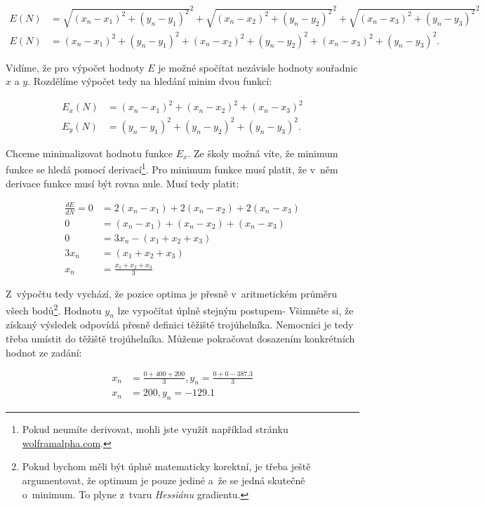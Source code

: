 \documentclass[12pt,a4paper]{article}
\begin{document}
\begin{align}
E(N) &= \sqrt{(x_n-x_1)^2 + (y_n - y_1)^2}^2 +
	\sqrt{(x_n-x_2)^2 + (y_n - y_2)^2}^2 +
	\sqrt{(x_n-x_3)^2 + (y_n - y_3)^2}^2 \nonumber \\
E(N) &= (x_n-x_1)^2 + (y_n - y_1)^2 +
	(x_n-x_2)^2 + (y_n - y_2)^2 +
	(x_n-x_3)^2 + (y_n - y_3)^2 \nonumber.
\end{align}

Vidíme, že pro výpočet hodnoty $E$ je možné spočítat nezávisle hodnoty souřadnic
$x$ a $y$. Rozdělíme výpočet tedy na hledání minim dvou funkcí:

\begin{align}
E_x(N) &= (x_n-x_1)^2 + (x_n-x_2)^2 + (x_n-x_3)^2 \nonumber \\
E_y(N) &= (y_n-y_1)^2 + (y_n-y_2)^2 + (y_n-y_3)^2 \nonumber.
\end{align}

Chceme minimalizovat hodnotu funkce $E_x$. Ze školy možná víte, že minimum
funkce se hledá pomocí derivací\footnote{Pokud neumíte derivovat, mohli jste
využít například stránku \url{wolframalpha.com}.}. Pro minimum funkce musí
platit, že v~něm derivace funkce musí být rovna nule. Musí tedy platit:

\begin{align}
\frac{dE}{dN} = 0 &= 2(x_n-x_1) + 2(x_n-x_2) + 2(x_n-x_3) \nonumber \\
0 &= (x_n-x_1) + (x_n-x_2) + (x_n-x_3) \nonumber \\
0 &= 3x_n - (x_1 + x_2 + x_3) \nonumber \\
3x_n &= (x_1 + x_2 + x_3) \nonumber \\
x_n &= \frac{x_1 + x_2 + x_3}{3} \nonumber
\end{align}

Z~výpočtu tedy vychází, že pozice optima je přesně v~aritmetickém průměru
všech bodů\footnote{Pokud bychom měli být úplně matematicky korektní, je třeba
ještě argumentovat, že optimum je pouze jediné a~že se jedná skutečně o~minimum.
To plyne z~tvaru \textit{Hessiánu} gradientu.}. Hodnotu $y_n$ lze vypočítat
úplně stejným postupem- Všimněte si, že získaný výsledek odpovídá přesně
definici těžiště trojúhelníka. Nemocnici je tedy třeba umístit do těžiště
trojúhelníka. Můžeme pokračovat dosazením konkrétních hodnot ze zadání:

\begin{align}
x_n &= \frac{0 + 400 + 200}{3}, y_n = \frac{0 + 0 - 387.3}{3} \nonumber \\
x_n &= 200, y_n = -129.1  \nonumber
\end{align}
\end{document}

